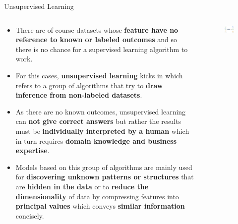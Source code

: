 \documentclass[document.tex]{subfiles}
\begin{document}
    \begin{frame}{Unsupervised Learning}
        \begin{columns}
            \begin{column}{.6\textwidth}
                \begin{itemize}
                    \item There are of course datasets whose \textbf{feature have no reference to known or labeled outcomes} and so there is no chance for a supervised learning algorithm to work.
                    \item For this cases, \textbf{unsupervised learning} kicks in which refers to a group of algorithms that try to \textbf{draw inference from non-labeled datasets}.
                    \item As there are no known outcomes, unsupervised learning can \textbf{not give correct answers} but rather the results must be \textbf{individually interpreted by a human} which in turn requires \textbf{domain knowledge and business expertise}.
                    \item Models based on this group of algorithms are mainly used for \textbf{discovering unknown patterns or structures} that are \textbf{hidden in the data} or to \textbf{reduce the dimensionality} of data by compressing features into \textbf{principal values} which conveys \textbf{similar information} concisely.
                \end{itemize}
            \end{column}
            \begin{column}{.4\textwidth}
                \begin{figure}
                    \label{fig:unsupervised-learning}
                    \includegraphics[width=\textwidth]{figures/drawio/unsupervised-learning.png}
                \end{figure}
            \end{column}
        \end{columns}
    \end{frame}
\end{document}
